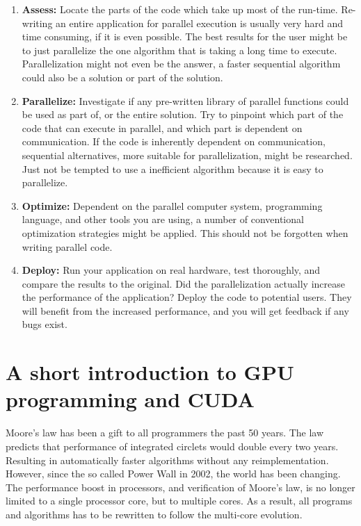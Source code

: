 \begin{enumerate}
    \item \textbf{Assess:} Locate the parts of the code which take up most of the run-time. Re-writing an entire application for parallel execution is usually very hard and time consuming, if it is even possible. The best results for the user might be to just parallelize the one algorithm that is taking a long time to execute. Parallelization might not even be the answer, a faster sequential algorithm could also be a solution or part of the solution.

    \item \textbf{Parallelize:} Investigate if any pre-written library of parallel functions could be used as part of, or the entire solution. Try to pinpoint which part of the code that can execute in parallel, and which part is dependent on communication. If the code is inherently dependent on communication, sequential alternatives, more suitable for parallelization, might be researched. Just not be tempted to use a inefficient algorithm because it is easy to parallelize.

    \item \textbf{Optimize:} Dependent on the parallel computer system, programming language, and other tools you are using, a number of conventional optimization strategies might be applied. This should not be forgotten when writing parallel code.

    \item \textbf{Deploy:} Run your application on real hardware, test thoroughly, and compare the results to the original. Did the parallelization actually increase the performance of the application? Deploy the code to potential users. They will benefit from the increased performance, and you will get feedback if any bugs exist.
\end{enumerate}


\section{A short introduction to GPU programming and CUDA} %
\label{sub:a_short_introduction_to_gpu_programming_and_cuda}

Moore's law has been a gift to all programmers the past 50 years. The law predicts that performance of integrated circlets would double every two years. Resulting in automatically faster algorithms without any reimplementation. However, since the so called Power Wall in 2002, the world has been changing. The performance boost  in processors, and verification of Moore's law, is no longer limited to a single processor core, but to multiple cores. As a result, all programs and algorithms has to be rewritten to follow the multi-core evolution.

